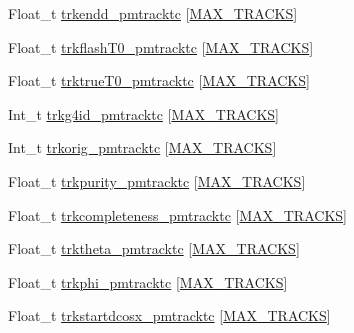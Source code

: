 \begin{DoxyCompactItemize}
\item 
Float\-\_\-t \hyperlink{classanatree_a15b080e24776c82776cc0e166872b67c}{trkendd\-\_\-pmtracktc} \mbox{[}\hyperlink{anatree__core__v09410002__orig_8h_a327fd4e796e4a0d78947524c96e4362e}{M\-A\-X\-\_\-\-T\-R\-A\-C\-K\-S}\mbox{]}
\item 
Float\-\_\-t \hyperlink{classanatree_a7af1237cd50841288249923a4abc49fa}{trkflash\-T0\-\_\-pmtracktc} \mbox{[}\hyperlink{anatree__core__v09410002__orig_8h_a327fd4e796e4a0d78947524c96e4362e}{M\-A\-X\-\_\-\-T\-R\-A\-C\-K\-S}\mbox{]}
\item 
Float\-\_\-t \hyperlink{classanatree_a0d8055f03c13fc09fdd485c0e5cdc776}{trktrue\-T0\-\_\-pmtracktc} \mbox{[}\hyperlink{anatree__core__v09410002__orig_8h_a327fd4e796e4a0d78947524c96e4362e}{M\-A\-X\-\_\-\-T\-R\-A\-C\-K\-S}\mbox{]}
\item 
Int\-\_\-t \hyperlink{classanatree_a45ee3f10137fb84a4c65c589e5203d4a}{trkg4id\-\_\-pmtracktc} \mbox{[}\hyperlink{anatree__core__v09410002__orig_8h_a327fd4e796e4a0d78947524c96e4362e}{M\-A\-X\-\_\-\-T\-R\-A\-C\-K\-S}\mbox{]}
\item 
Int\-\_\-t \hyperlink{classanatree_a159bba3972eda8524df8db1fe95a7940}{trkorig\-\_\-pmtracktc} \mbox{[}\hyperlink{anatree__core__v09410002__orig_8h_a327fd4e796e4a0d78947524c96e4362e}{M\-A\-X\-\_\-\-T\-R\-A\-C\-K\-S}\mbox{]}
\item 
Float\-\_\-t \hyperlink{classanatree_a153f631b584b3b365349b970e5851bc8}{trkpurity\-\_\-pmtracktc} \mbox{[}\hyperlink{anatree__core__v09410002__orig_8h_a327fd4e796e4a0d78947524c96e4362e}{M\-A\-X\-\_\-\-T\-R\-A\-C\-K\-S}\mbox{]}
\item 
Float\-\_\-t \hyperlink{classanatree_a824acc5847e9cc75ff10cf27b9f29d0d}{trkcompleteness\-\_\-pmtracktc} \mbox{[}\hyperlink{anatree__core__v09410002__orig_8h_a327fd4e796e4a0d78947524c96e4362e}{M\-A\-X\-\_\-\-T\-R\-A\-C\-K\-S}\mbox{]}
\item 
Float\-\_\-t \hyperlink{classanatree_ae37bd05d4845c918a19b092f6f3b0e77}{trktheta\-\_\-pmtracktc} \mbox{[}\hyperlink{anatree__core__v09410002__orig_8h_a327fd4e796e4a0d78947524c96e4362e}{M\-A\-X\-\_\-\-T\-R\-A\-C\-K\-S}\mbox{]}
\item 
Float\-\_\-t \hyperlink{classanatree_a99ac97914c8806704d7f80ae01d003a1}{trkphi\-\_\-pmtracktc} \mbox{[}\hyperlink{anatree__core__v09410002__orig_8h_a327fd4e796e4a0d78947524c96e4362e}{M\-A\-X\-\_\-\-T\-R\-A\-C\-K\-S}\mbox{]}
\item 
Float\-\_\-t \hyperlink{classanatree_ac4dd1f89a416b66137d08d095bc95924}{trkstartdcosx\-\_\-pmtracktc} \mbox{[}\hyperlink{anatree__core__v09410002__orig_8h_a327fd4e796e4a0d78947524c96e4362e}{M\-A\-X\-\_\-\-T\-R\-A\-C\-K\-S}\mbox{]}

\end{DoxyCompactItemize}
